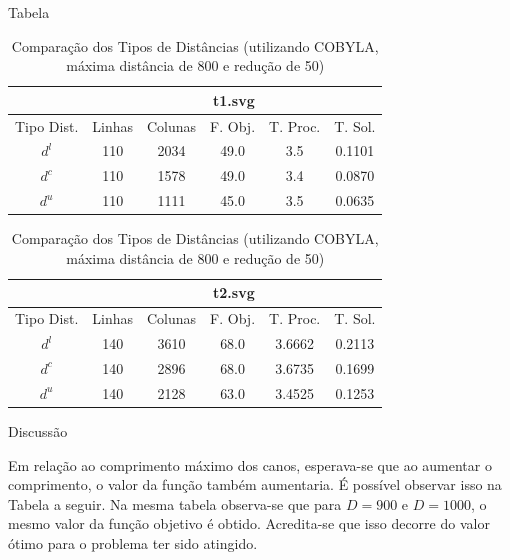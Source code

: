 \documentclass[11pt]{beamer}
\begin{document}
\begin{frame}{Tabela}
\begin{table}
    \centering
    \caption{Comparação dos Tipos de Distâncias (utilizando COBYLA, máxima
    distância de 800 e redução de 50)}
    \label{tab:dtype}
    \begin{tabular}{|c|c|c|c|c|c|}
        \hline
        & \multicolumn{5}{|c|}{t1.svg}  \\ \hline
        Tipo Dist. & Linhas & Colunas & F. Obj. & T. Proc. & T. Sol. \\ \hline
        $d^l$ & 110 & 2034 & 49.0 & 3.5 & 0.1101 \\ \hline
        $d^c$ & 110 & 1578 & 49.0 & 3.4 & 0.0870 \\ \hline
        $d^u$ & 110 & 1111 & 45.0 & 3.5 & 0.0635 \\ \hline
        \end{tabular}        
        \begin{tabular}{|c|c|c|c|c|c|}
        \hline
        & \multicolumn{5}{|c|}{t2.svg} \\ \hline
        Tipo Dist. & Linhas & Colunas & F. Obj. & T. Proc. & T. Sol. \\ \hline
        $d^l$ & 140 & 3610 & 68.0 & 3.6662 & 0.2113 \\ \hline
        $d^c$ & 140 & 2896 & 68.0 & 3.6735 & 0.1699 \\ \hline
        $d^u$ & 140 & 2128 & 63.0 & 3.4525 & 0.1253 \\ \hline
	    \end{tabular}
\end{table}
\end{frame}

\begin{frame}{Discussão}
\begin{block}{}
Em relação ao comprimento máximo dos canos, esperava-se que ao aumentar o
comprimento, o valor da função também aumentaria. É possível observar isso na
Tabela a seguir.%
Na mesma tabela observa-se que para $D = 900$ e $D =
1000$, o mesmo valor da função objetivo é obtido. Acredita-se que isso decorre
do valor ótimo para o problema ter sido atingido.
\end{block}
\end{frame}
\end{document}

